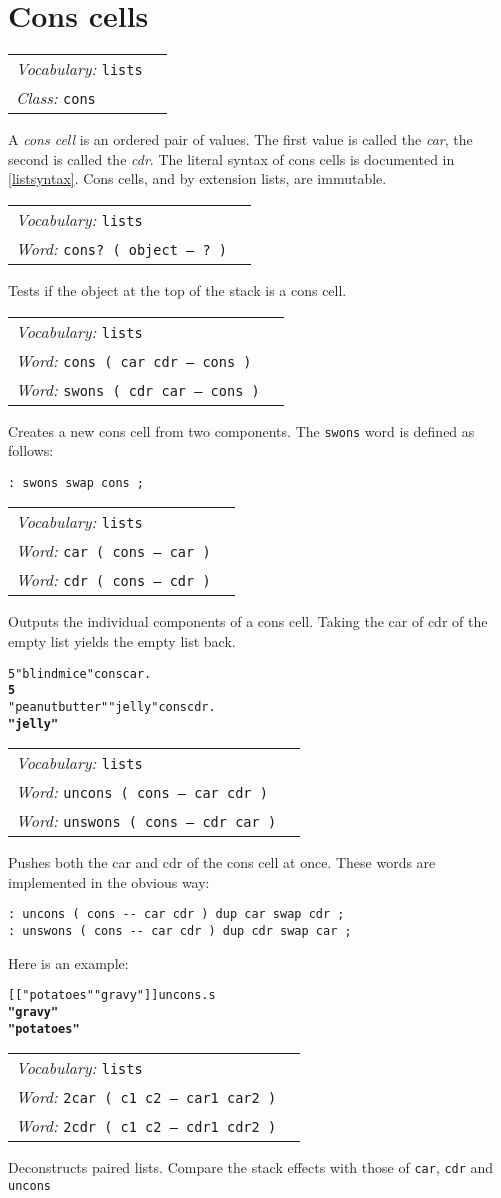 \documentclass{book}
\newcommand{\vocabulary}[1]{\emph{Vocabulary:} \texttt{#1}&\\}
\newcommand{\ordinaryword}[2]{\index{\texttt{#1}}\emph{Word:} \texttt{#2}&\\}
\newcommand{\classword}[1]{\index{\texttt{#1}}\emph{Class:} \texttt{#1}&\\}
\newcommand{\wordtable}[1]{


\begin{tabularx}{12cm}{lX}
\hline
#1
\hline
\end{tabularx}

}
\begin{document}
\section{Cons cells}\label{cons-cells}

\consglos
{}

\wordtable{
\vocabulary{lists}
\classword{cons}
}
A \emph{cons cell} is an ordered pair of values. The first value is called the \emph{car},
the second is called the \emph{cdr}. The literal syntax of cons cells is documented in \ref{listsyntax}.
Cons cells, and by extension lists, are immutable.

\wordtable{
\vocabulary{lists}
\ordinaryword{cons?}{cons?~( object -- ?~)}
}
Tests if the object at the top of the stack is a cons cell.
\wordtable{
\vocabulary{lists}
\ordinaryword{cons}{cons ( car cdr -- cons )}
\ordinaryword{swons}{swons ( cdr car -- cons )}
}
Creates a new cons cell from two components. The \texttt{swons} word is defined as follows:
\begin{verbatim}
: swons swap cons ;
\end{verbatim}
\wordtable{
\vocabulary{lists}
\ordinaryword{car}{car ( cons -- car )}
\ordinaryword{cdr}{cdr ( cons -- cdr )}
}
Outputs the individual components of a cons cell. Taking the car of cdr of the empty list yields the empty list back.
\begin{alltt}
  5 "blind mice" cons car .
\textbf{5}
  "peanut butter" "jelly" cons cdr .
\textbf{"jelly"}
\end{alltt}
\wordtable{
\vocabulary{lists}
\ordinaryword{uncons}{uncons ( cons -- car cdr )}
\ordinaryword{unswons}{unswons ( cons -- cdr car )}
}
Pushes both the car and cdr of the cons cell at once. These words are implemented in the obvious way:
\begin{verbatim}
: uncons ( cons -- car cdr ) dup car swap cdr ;
: unswons ( cons -- car cdr ) dup cdr swap car ;
\end{verbatim}
Here is an example:
\begin{alltt}
  {[[} "potatoes" "gravy" {]]} uncons .s
\textbf{"gravy"
"potatoes"}
\end{alltt}

\wordtable{
\vocabulary{lists}
\ordinaryword{2car}{2car ( c1 c2 -- car1 car2 )}
\ordinaryword{2cdr}{2cdr ( c1 c2 -- cdr1 cdr2 )}
}
Deconstructs paired lists. Compare the stack effects with those of \verb|car|, \verb|cdr| and \verb|uncons|
\end{document}
